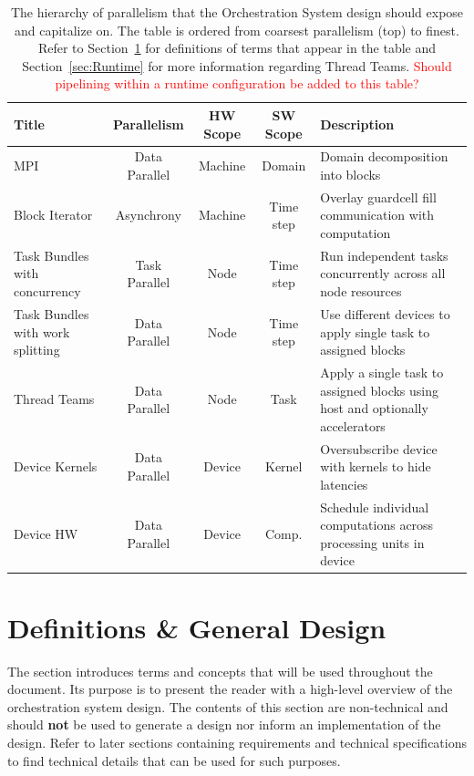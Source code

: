\documentclass{article}
\begin{document}
\begin{table}[!t]
\label{tab:ParallelHierarchy}
\caption{The hierarchy of parallelism that the Orchestration System design
should expose and capitalize on.  The table is ordered from coarsest parallelism
(top) to finest.  Refer to Section~\ref{sec:Definitions} for definitions of
terms that appear in the table and Section~\ref{sec:Runtime} for more
information regarding Thread Teams.  \textcolor{red}{Should pipelining within a
runtime configuration be added to this table?}}

\begin{center}

\begin{tabular}{|p{1.1in}|c|c|c|p{2.25in}|}
\hline
Title & Parallelism & HW Scope & SW Scope & Description\\
\hline
\hline
MPI                              & Data Parallel & Machine & Domain    & Domain decomposition into blocks\\
\hline
Block Iterator                   & Asynchrony    & Machine & Time step & Overlay guardcell fill communication with computation\\
\hline
Task Bundles with concurrency    & Task Parallel & Node    & Time step & Run independent tasks concurrently across all node resources\\
\hline
Task Bundles with work splitting & Data Parallel & Node    & Time step & Use different devices to apply single task to assigned blocks\\ 
\hline
Thread Teams                     & Data Parallel & Node    & Task      & Apply a single task to assigned blocks using host and optionally accelerators\\
\hline
Device Kernels                   & Data Parallel & Device  & Kernel    & Oversubscribe device with kernels to hide latencies\\
\hline
Device HW                        & Data Parallel & Device  & Comp.     & Schedule individual computations across processing units in device\\
\hline
\end{tabular}

\end{center}
\end{table}

\section{Definitions \& General Design}
\label{sec:Definitions}
The section introduces terms and concepts that will be used throughout the
document.  Its purpose is to present the reader with a high-level overview of
the orchestration system design.  The contents of this section are non-technical
and should \textbf{not} be used to generate a design nor inform an
implementation of the design.  Refer to later sections containing requirements
and technical specifications to find technical details that can be used for such
purposes.\\
\end{document}
